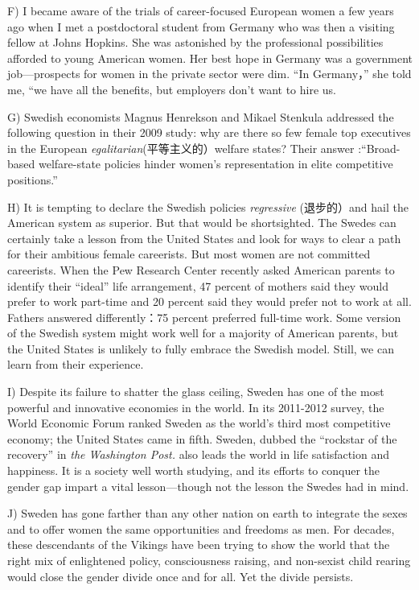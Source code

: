 \documentclass[UTF8,11pt]{ctexart}
\begin{document}
F) I became aware of the trials of career-focused European women a few years ago when I met a postdoctoral student from Germany who was then a visiting fellow at Johns Hopkins. She was astonished by the professional possibilities afforded to young American women. Her best hope in Germany was a government job—prospects for women in the private sector were dim. “In Germany，” she told me, “we have all the benefits, but employers don’t want to hire us.


G) Swedish economists Magnus Henrekson and Mikael Stenkula addressed the following question in their 2009 study: why are there so few female top executives in the European \textit{egalitarian}(平等主义的）welfare states? Their answer :“Broad-based welfare-state policies hinder women’s representation in elite competitive positions.”


H) It is tempting to declare the Swedish policies\textit{ regressive} (退步的）and hail the American system as superior. But that would be shortsighted. The Swedes can certainly take a lesson from the United States and look for ways to clear a path for their ambitious female careerists. But most women are not committed careerists. When the Pew Research Center recently asked American parents to identify their “ideal” life arrangement, 47 percent of mothers said they would prefer to work part-time and 20 percent said they would prefer not to work at all. Fathers answered differently：75 percent preferred full-time work. Some version of the Swedish system might work well for a majority of American parents, but the United States is unlikely to fully embrace the Swedish model. Still, we can learn from their experience.


I) Despite its failure to shatter the glass ceiling, Sweden has one of the most powerful and innovative economies in the world. In its 2011-2012 survey, the World Economic Forum ranked Sweden as the world’s third most competitive economy; the United States came in fifth. Sweden, dubbed the “rockstar of the recovery” in\textit{ the Washington Post.} also leads the world in life satisfaction and happiness. It is a society well worth studying, and its efforts to conquer the gender gap impart a vital lesson—though not the lesson the Swedes had in mind.


J) Sweden has gone farther than any other nation on earth to integrate the sexes and to offer women the same opportunities and freedoms as men. For decades, these descendants of the Vikings have been trying to show the world that the right mix of enlightened policy, consciousness raising, and non-sexist child rearing would close the gender divide once and for all. Yet the divide persists.
\end{document}
